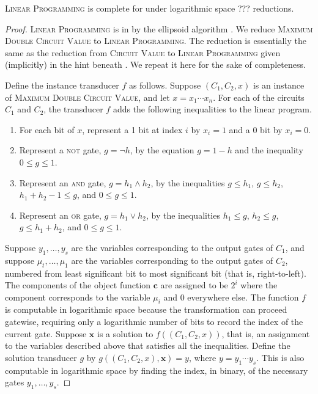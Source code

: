 \documentclass[]{article}
\begin{document}
\begin{theorem}\label{thm:lpinpo}
  \textsc{Linear Programming} is complete for \PO{} under logarithmic space ??? reductions.
\end{theorem}
\begin{proof}
  \textsc{Linear Programming} is in \PO{} by the ellipsoid algorithm \cite{khachian79}.
  We reduce \textsc{Maximum Double Circuit Value} to \textsc{Linear Programming}.
  The reduction is essentially the same as the reduction from \textsc{Circuit Value} to \textsc{Linear Programming} given (implicitly) in the hint beneath \cite[Problem~A.4.1]{ghr95}.
  We repeat it here for the sake of completeness.

  Define the instance transducer $f$ as follows.
  Suppose $(C_1, C_2, x)$ is an instance of \textsc{Maximum Double Circuit Value}, and let $x = x_1 \dotsb x_n$.
  For each of the circuits $C_1$ and $C_2$, the transducer $f$ adds the following inequalities to the linear program.
  \begin{enumerate}
  \item For each bit of $x$, represent a 1 bit at index $i$ by $x_i = 1$ and a 0 bit by $x_i = 0$.
  \item Represent a \textsc{not} gate, $g = \lnot h$, by the equation $g = 1 - h$ and the inequality $0 \leq g \leq 1$.
  \item Represent an \textsc{and} gate, $g = h_1 \land h_2$, by the inequalities $g \leq h_1$, $g \leq h_2$, $h_1 + h_2 - 1 \leq g$, and $0 \leq g \leq 1$.
  \item Represent an \textsc{or} gate, $g = h_1 \lor h_2$, by the inequalities $h_1 \leq g$, $h_2 \leq g$, $g \leq h_1 + h_2$, and $0 \leq g \leq 1$.
  \end{enumerate}
  Suppose $y_1, \dotsc, y_s$ are the variables corresponding to the output gates of $C_1$, and suppose $\mu_t, \dotsc, \mu_1$ are the variables corresponding to the output gates of $C_2$, numbered from least significant bit to most significant bit (that is, right-to-left).
  The components of the object function $\mathbf{c}$ are assigned to be $2^i$ where the component corresponds to the variable $\mu_i$ and 0 everywhere else.
  The function $f$ is computable in logarithmic space because the transformation can proceed gatewise, requiring only a logarithmic number of bits to record the index of the current gate.
  Suppose $\mathbf{x}$ is a solution to $f((C_1, C_2, x))$, that is, an assignment to the variables described above that satisfies all the inequalities.
  Define the solution transducer $g$ by $g((C_1, C_2, x), \mathbf{x}) = y$, where $y = y_1 \dotsb y_s$.
  This is also computable in logarithmic space by finding the index, in binary, of the necessary gates $y_1, \dotsc, y_s$.


\end{proof}
\end{document}
